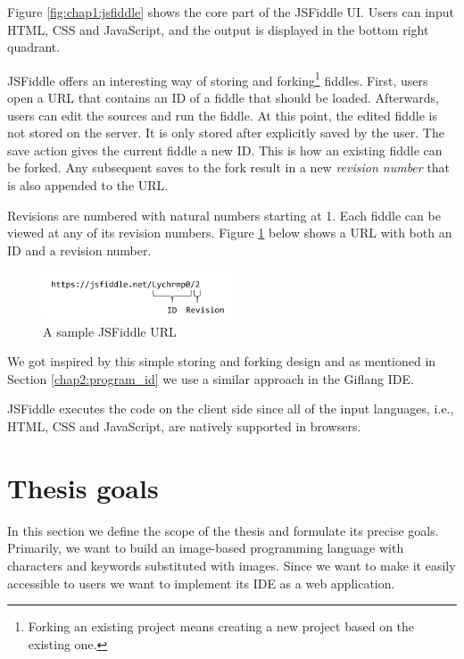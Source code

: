 Figure \ref{fig:chap1:jsfiddle} shows the core part of the JSFiddle UI. Users can input HTML, CSS and JavaScript, and the output is displayed in the
bottom right quadrant.

JSFiddle offers an interesting way of storing and forking\footnote{Forking an existing project means creating a new project based on the existing one.}
fiddles. First, users open a URL that contains an ID of a fiddle that should be loaded. Afterwards, users can edit the sources and run the fiddle.
At this point, the edited fiddle is not stored on the server. It is only stored after explicitly saved by the user. The save action gives the current
fiddle a new ID. This is how an existing fiddle can be forked. Any subsequent saves to the fork result in a new \emph{revision number} that is also
appended to the URL.

Revisions are numbered with natural numbers starting at 1. Each fiddle can be viewed at any of its revision numbers. Figure \ref{fig:chap1:jsfiddle_url}
below shows a URL with both an ID and a revision number.
\begin{figure}[!hbt]
    \centering
	\includegraphics[width=0.5\textwidth]{../img/jsfiddle_url}
	\caption{A sample JSFiddle URL}
	\label{fig:chap1:jsfiddle_url}
\end{figure}

We got inspired by this simple storing and forking design and as mentioned in Section \ref{chap2:program_id} we use a similar approach in the Giflang IDE.

JSFiddle executes the code on the client side since all of the input languages, i.e., HTML, CSS and JavaScript, are natively supported in browsers.

\section{Thesis goals}
\label{chap1:thesis_goals}
In this section we define the scope of the thesis and formulate its precise goals. Primarily, we want to build an image-based programming language
with characters and keywords substituted with images. Since we want to make it easily accessible to users we want to implement its
IDE as a web application.

